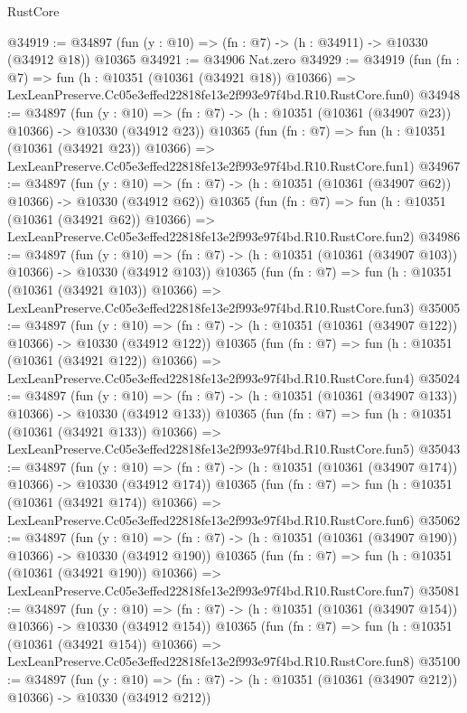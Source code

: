 \begin{lexlean}{RustCore}
\begin{coremodule}
@34919 := @34897 (fun (y : @10) => (fn : @7) -> (h : @34911) -> @10330 (@34912 @18)) @10365
@34921 := @34906 Nat.zero
@34929 := @34919
    (fun (fn : @7) =>
    fun (h : @10351 (@10361 (@34921 @18)) @10366) =>
    LexLeanPreserve.Cc05e3effed22818fe13e2f993e97f4bd.R10.RustCore.fun0)
@34948 := @34897
    (fun (y : @10) => (fn : @7) -> (h : @10351 (@10361 (@34907 @23)) @10366) -> @10330 (@34912 @23))
    @10365
    (fun (fn : @7) =>
    fun (h : @10351 (@10361 (@34921 @23)) @10366) =>
    LexLeanPreserve.Cc05e3effed22818fe13e2f993e97f4bd.R10.RustCore.fun1)
@34967 := @34897
    (fun (y : @10) => (fn : @7) -> (h : @10351 (@10361 (@34907 @62)) @10366) -> @10330 (@34912 @62))
    @10365
    (fun (fn : @7) =>
    fun (h : @10351 (@10361 (@34921 @62)) @10366) =>
    LexLeanPreserve.Cc05e3effed22818fe13e2f993e97f4bd.R10.RustCore.fun2)
@34986 := @34897
    (fun (y : @10) =>
    (fn : @7) -> (h : @10351 (@10361 (@34907 @103)) @10366) -> @10330 (@34912 @103))
    @10365
    (fun (fn : @7) =>
    fun (h : @10351 (@10361 (@34921 @103)) @10366) =>
    LexLeanPreserve.Cc05e3effed22818fe13e2f993e97f4bd.R10.RustCore.fun3)
@35005 := @34897
    (fun (y : @10) =>
    (fn : @7) -> (h : @10351 (@10361 (@34907 @122)) @10366) -> @10330 (@34912 @122))
    @10365
    (fun (fn : @7) =>
    fun (h : @10351 (@10361 (@34921 @122)) @10366) =>
    LexLeanPreserve.Cc05e3effed22818fe13e2f993e97f4bd.R10.RustCore.fun4)
@35024 := @34897
    (fun (y : @10) =>
    (fn : @7) -> (h : @10351 (@10361 (@34907 @133)) @10366) -> @10330 (@34912 @133))
    @10365
    (fun (fn : @7) =>
    fun (h : @10351 (@10361 (@34921 @133)) @10366) =>
    LexLeanPreserve.Cc05e3effed22818fe13e2f993e97f4bd.R10.RustCore.fun5)
@35043 := @34897
    (fun (y : @10) =>
    (fn : @7) -> (h : @10351 (@10361 (@34907 @174)) @10366) -> @10330 (@34912 @174))
    @10365
    (fun (fn : @7) =>
    fun (h : @10351 (@10361 (@34921 @174)) @10366) =>
    LexLeanPreserve.Cc05e3effed22818fe13e2f993e97f4bd.R10.RustCore.fun6)
@35062 := @34897
    (fun (y : @10) =>
    (fn : @7) -> (h : @10351 (@10361 (@34907 @190)) @10366) -> @10330 (@34912 @190))
    @10365
    (fun (fn : @7) =>
    fun (h : @10351 (@10361 (@34921 @190)) @10366) =>
    LexLeanPreserve.Cc05e3effed22818fe13e2f993e97f4bd.R10.RustCore.fun7)
@35081 := @34897
    (fun (y : @10) =>
    (fn : @7) -> (h : @10351 (@10361 (@34907 @154)) @10366) -> @10330 (@34912 @154))
    @10365
    (fun (fn : @7) =>
    fun (h : @10351 (@10361 (@34921 @154)) @10366) =>
    LexLeanPreserve.Cc05e3effed22818fe13e2f993e97f4bd.R10.RustCore.fun8)
@35100 := @34897
    (fun (y : @10) =>
    (fn : @7) -> (h : @10351 (@10361 (@34907 @212)) @10366) -> @10330 (@34912 @212))

\end{coremodule}
\end{lexlean}
